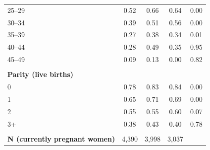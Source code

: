 \begin{tabular}{lcccc}
\hspace*{2em}25–29&0.52&0.66&0.64&0.00\\
\hspace*{2em}30–34&0.39&0.51&0.56&0.00\\
\hspace*{2em}35–39&0.27&0.38&0.34&0.01\\
\hspace*{2em}40–44&0.28&0.49&0.35&0.95\\
\hspace*{2em}45–49&0.09&0.13&0.00&0.82\\
&&&&\\
\textbf{Parity (live births)}&&&&\\
\hspace*{2em}0&0.78&0.83&0.84&0.00\\
\hspace*{2em}1&0.65&0.71&0.69&0.00\\
\hspace*{2em}2&0.55&0.55&0.60&0.07\\
\hspace*{2em}3+&0.38&0.43&0.40&0.78\\
&&&&\\
\textbf{N (currently pregnant women)}&4,390&3,998&3,037&\\
\bottomrule
\end{tabular}
